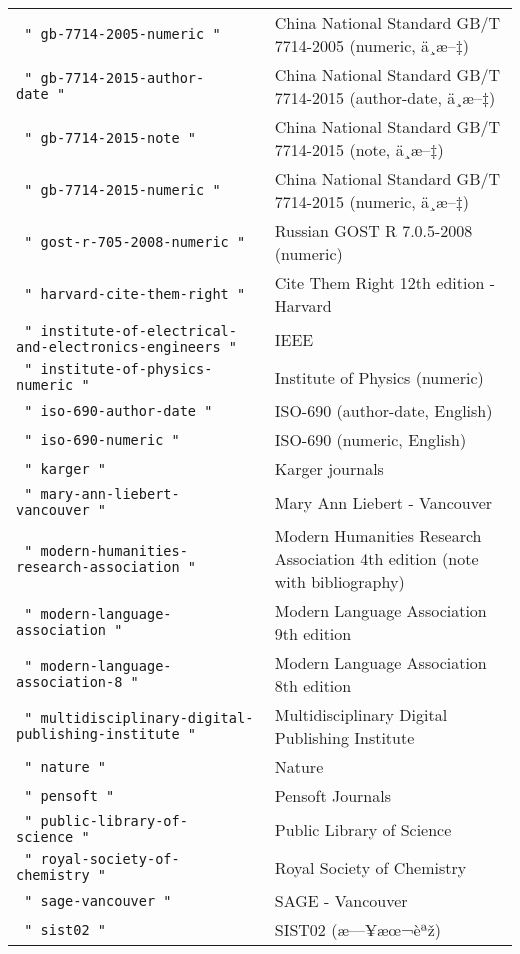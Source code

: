 \begin{longtable}[]{@{}ll@{}}
\texttt{\ "\ gb-7714-2005-numeric\ "\ } & China National Standard GB/T
7714-2005 (numeric, ä¸­æ--‡) \\
\texttt{\ "\ gb-7714-2015-author-date\ "\ } & China National Standard
GB/T 7714-2015 (author-date, ä¸­æ--‡) \\
\texttt{\ "\ gb-7714-2015-note\ "\ } & China National Standard GB/T
7714-2015 (note, ä¸­æ--‡) \\
\texttt{\ "\ gb-7714-2015-numeric\ "\ } & China National Standard GB/T
7714-2015 (numeric, ä¸­æ--‡) \\
\texttt{\ "\ gost-r-705-2008-numeric\ "\ } & Russian GOST R 7.0.5-2008
(numeric) \\
\texttt{\ "\ harvard-cite-them-right\ "\ } & Cite Them Right 12th
edition - Harvard \\
\texttt{\ "\ institute-of-electrical-and-electronics-engineers\ "\ } &
IEEE \\
\texttt{\ "\ institute-of-physics-numeric\ "\ } & Institute of Physics
(numeric) \\
\texttt{\ "\ iso-690-author-date\ "\ } & ISO-690 (author-date,
English) \\
\texttt{\ "\ iso-690-numeric\ "\ } & ISO-690 (numeric, English) \\
\texttt{\ "\ karger\ "\ } & Karger journals \\
\texttt{\ "\ mary-ann-liebert-vancouver\ "\ } & Mary Ann Liebert -
Vancouver \\
\texttt{\ "\ modern-humanities-research-association\ "\ } & Modern
Humanities Research Association 4th edition (note with bibliography) \\
\texttt{\ "\ modern-language-association\ "\ } & Modern Language
Association 9th edition \\
\texttt{\ "\ modern-language-association-8\ "\ } & Modern Language
Association 8th edition \\
\texttt{\ "\ multidisciplinary-digital-publishing-institute\ "\ } &
Multidisciplinary Digital Publishing Institute \\
\texttt{\ "\ nature\ "\ } & Nature \\
\texttt{\ "\ pensoft\ "\ } & Pensoft Journals \\
\texttt{\ "\ public-library-of-science\ "\ } & Public Library of
Science \\
\texttt{\ "\ royal-society-of-chemistry\ "\ } & Royal Society of
Chemistry \\
\texttt{\ "\ sage-vancouver\ "\ } & SAGE - Vancouver \\
\texttt{\ "\ sist02\ "\ } & SIST02 (æ---¥æœ¬èªž) \\

\end{longtable}
